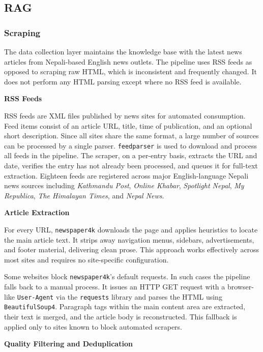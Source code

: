\subsection{RAG}

\subsubsection{Scraping}

The data collection layer maintains the knowledge base with the latest news articles from Nepali-based English news outlets. The pipeline uses RSS feeds as opposed to scraping raw HTML, which is inconsistent and frequently changed. It does not perform any HTML parsing except where no RSS feed is available.

\textbf{RSS Feeds}

RSS feeds are XML files published by news sites for automated consumption. Feed items consist of an article URL, title, time of publication, and an optional short description. Since all sites share the same format, a large number of sources can be processed by a single parser. \texttt{feedparser} is used to download and process all feeds in the pipeline. The scraper, on a per-entry basis, extracts the URL and date, verifies the entry has not already been processed, and queues it for full-text extraction. Eighteen feeds are registered across major English-language Nepali news sources including \textit{Kathmandu Post}, \textit{Online Khabar}, \textit{Spotlight Nepal}, \textit{My Republica}, \textit{The Himalayan Times}, and \textit{Nepal News}.

\textbf{Article Extraction}

For every URL, \texttt{newspaper4k} downloads the page and applies heuristics to locate the main article text. It strips away navigation menus, sidebars, advertisements, and footer material, delivering clean prose. This approach works effectively across most sites and requires no site-specific configuration.

Some websites block \texttt{newspaper4k}'s default requests. In such cases the pipeline falls back to a manual process. It issues an HTTP GET request with a browser-like \texttt{User-Agent} via the \texttt{requests} library and parses the HTML using \texttt{BeautifulSoup4}. Paragraph tags within the main content area are extracted, their text is merged, and the article body is reconstructed. This fallback is applied only to sites known to block automated scrapers.

\textbf{Quality Filtering and Deduplication}

